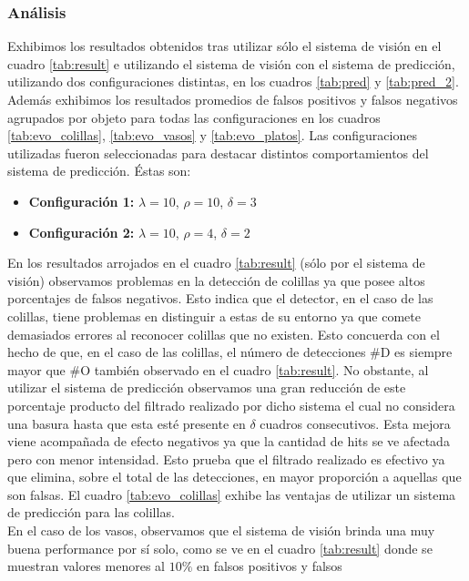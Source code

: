 \subsubsection{An\'alisis}
Exhibimos los resultados obtenidos tras utilizar s\'olo el sistema de 
visi\'on en el cuadro \ref{tab:result} e utilizando el sistema de 
visi\'on con el sistema de predicci\'on, utilizando dos configuraciones 
distintas, en 
los cuadros \ref{tab:pred} y  \ref{tab:pred_2}. Adem\'as exhibimos los 
resultados promedios de falsos positivos y falsos negativos agrupados 
por objeto para todas las configuraciones en los cuadros \ref{tab:evo_colillas}, 
\ref{tab:evo_vasos} y \ref{tab:evo_platos}. Las configuraciones 
utilizadas fueron seleccionadas para destacar distintos comportamientos del 
sistema de predicci\'on. Éstas son:
\begin{itemize}
\item{\textbf{Configuraci\'on 1:} $\lambda=10$, $\rho=10$, $\delta=3$}
	\item{\textbf{Configuraci\'on 2:} $\lambda=10$, $\rho=4$, $\delta=2$}
\end{itemize}
\indent En los resultados arrojados en el cuadro \ref{tab:result} 
(s\'olo por el sistema de visi\'on) observamos problemas en la  detecci\'on de colillas ya que posee altos 
porcentajes de falsos negativos. Esto indica que el detector, en el 
caso de las colillas, tiene
problemas en distinguir a estas de su entorno ya que comete 
demasiados errores al reconocer colillas que no existen. Esto concuerda 
con el hecho de que, en el caso de las colillas, el n\'umero de 
detecciones \#D es siempre mayor que \#O tambi\'en observado en el 
cuadro \ref{tab:result}. No obstante, al utilizar el sistema de 
predicci\'on observamos una gran reducci\'on de este porcentaje producto 
del filtrado realizado por dicho sistema el cual no considera una 
basura hasta que esta est\'e presente en $\delta$ cuadros consecutivos.  
Esta mejora viene acompa\~nada de efecto negativos ya que la cantidad de 
hits se ve afectada pero con menor intensidad. Esto prueba que el 
filtrado realizado es efectivo ya que elimina, sobre el total de las 
detecciones, en mayor proporci\'on a 
aquellas que son falsas. El cuadro \ref{tab:evo_colillas} exhibe las ventajas de utilizar un sistema de 
predicci\'on para las colillas.\\
\indent 
En el caso de los vasos, observamos que el sistema de visi\'on brinda 
una muy buena performance por s\'i solo, como se ve en el cuadro \ref{tab:result} 
donde se muestran valores menores al $10\%$ en falsos positivos y falsos 
